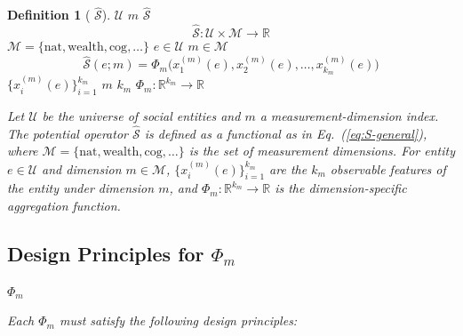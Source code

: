 \documentclass[11pt,a4paper]{article}
\theoremstyle{definition}
\newtheorem{definition}{ Definition}[section]
\newcommand{\Sop}{\hat{\mathcal{S}}}
\newcommand{\R}{\mathbb{R}}
\newcommand{\universe}{\mathcal{U}}
\begin{document}
\begin{definition}[ $\Sop$]
 $\universe$ $m$  $\Sop$ 
\begin{equation}
    \Sop: \universe \times \mathcal{M} \to \R
\end{equation}
 $\mathcal{M} = \{\text{nat}, \text{wealth}, \text{cog}, \ldots\}$ 
 $e \in \universe$  $m \in \mathcal{M}$
\begin{equation}
    \Sop(e; m) = \Phi_m\big(x_1^{(m)}(e), x_2^{(m)}(e), \ldots, x_{k_m}^{(m)}(e)\big)
    \label{eq:S-general}
\end{equation}
 $\{x_i^{(m)}(e)\}_{i=1}^{k_m}$  $m$  $k_m$ 
$\Phi_m: \R^{k_m} \to \R$ 

\medskip
\noindent\textit{Let $\universe$ be the universe of social entities and $m$ a measurement-dimension index. The potential operator $\Sop$ is defined as a functional as in Eq.~(\ref{eq:S-general}), where $\mathcal{M} = \{\text{nat}, \text{wealth}, \text{cog}, \ldots\}$ is the set of measurement dimensions. For entity $e \in \universe$ and dimension $m \in \mathcal{M}$, $\{x_i^{(m)}(e)\}_{i=1}^{k_m}$ are the $k_m$ observable features of the entity under dimension $m$, and $\Phi_m: \R^{k_m} \to \R$ is the dimension-specific aggregation function.}
\end{definition}

\subsection{ Design Principles for $\Phi_m$}

 $\Phi_m$ 

\medskip
\noindent\textit{Each $\Phi_m$ must satisfy the following design principles:}
\end{document}
